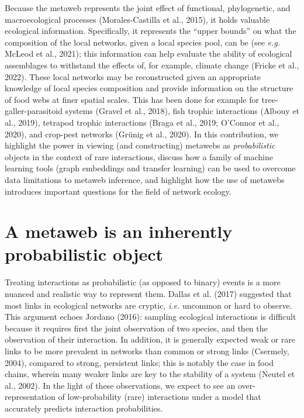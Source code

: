 \documentclass[10pt,oneside]{article}
\begin{document}
Because the metaweb represents the joint effect of functional,
phylogenetic, and macroecological processes (Morales-Castilla et al.,
2015), it holds valuable ecological information. Specifically, it
represents the ``upper bounds'' on what the composition of the local
networks, given a local species pool, can be (see \emph{e.g.} McLeod et
al., 2021); this information can help evaluate the ability of ecological
assemblages to withstand the effects of, for example, climate change
(Fricke et al., 2022). These local networks may be reconstructed given
an appropriate knowledge of local species composition and provide
information on the structure of food webs at finer spatial scales. This
has been done for example for tree-galler-parasitoid systems (Gravel et
al., 2018), fish trophic interactions (Albouy et al., 2019), tetrapod
trophic interactions (Braga et al., 2019; O'Connor et al., 2020), and
crop-pest networks (Grünig et al., 2020). In this contribution, we
highlight the power in viewing (and constructing) metawebs as
\emph{probabilistic} objects in the context of rare interactions,
discuss how a family of machine learning tools (graph embeddings and
transfer learning) can be used to overcome data limitations to metaweb
inference, and highlight how the use of metawebs introduces important
questions for the field of network ecology.

\hypertarget{a-metaweb-is-an-inherently-probabilistic-object}{%
\section{A metaweb is an inherently probabilistic
object}\label{a-metaweb-is-an-inherently-probabilistic-object}}

Treating interactions as probabilistic (as opposed to binary) events is
a more nuanced and realistic way to represent them. Dallas et al. (2017)
suggested that most links in ecological networks are cryptic,
\emph{i.e.} uncommon or hard to observe. This argument echoes Jordano
(2016): sampling ecological interactions is difficult because it
requires first the joint observation of two species, and then the
observation of their interaction. In addition, it is generally expected
weak or rare links to be more prevalent in networks than common or
strong links (Csermely, 2004), compared to strong, persistent links;
this is notably the case in food chains, wherein many weaker links are
key to the stability of a system (Neutel et al., 2002). In the light of
these observations, we expect to see an over-representation of
low-probability (rare) interactions under a model that accurately
predicts interaction probabilities.
\end{document}
